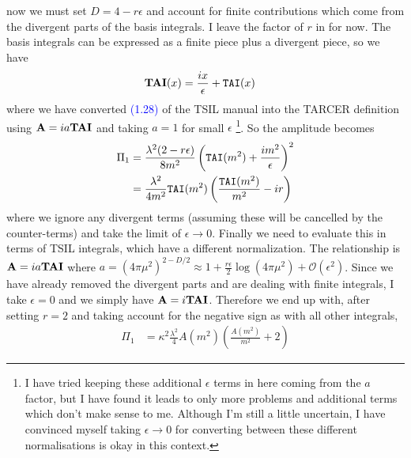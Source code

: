 \documentclass[11pt]{article}
\begin{document}
now we must set $D=4-r\epsilon$ and account for finite contributions which come from the divergent parts of the basis integrals.  I leave the factor of $r$ in for now.  The basis integrals can be expressed as a finite piece plus a divergent piece, so we have
\begin{align}
{\tt{\mathbf{TAI}}}(x) &= \frac{ix}{\epsilon} +  {\tt{TAI}}(x)
\end{align}
where we have converted \textcolor{blue}{(1.28)} of the TSIL manual into the TARCER definition using $\mathbf{A}= ia \tt{\mathbf{TAI}}$ and taking $a=1$ for small $\epsilon$ \footnote{I have tried keeping these additional $\epsilon$ terms in here coming from the $a$ factor, but I have found it leads to only more problems and additional terms which don't make sense to me.  Although I'm still a little uncertain, I have convinced myself taking $\epsilon \rightarrow 0$ for converting between these different normalisations is okay in this context.}.  So the amplitude becomes
\begin{align*}
\Pi_1 &= \frac{\lambda^2(2-r\epsilon)}{8 m^2 }       \left( {\tt{TAI}}(m^2) +\frac{im^2}{\epsilon}\right)^2  \\
&= \frac{\lambda^2}{4 m^2 }  {\tt{TAI}}(m^2) \left( \frac{ {\tt{TAI}}(m^2) } {m^2} - ir\right)
\end{align*}
where we ignore any divergent terms (assuming these will be cancelled by the counter-terms) and take the limit of $\epsilon\rightarrow 0$.
Finally we need to evaluate this in terms of TSIL integrals, which have a different normalization.  The relationship is $\mathbf{A}= ia \tt{\mathbf{TAI}}$ where $a = (4\pi\mu^2)^{2-D/2} \approx 1 +\frac{r\epsilon}{2}\log(4\pi\mu^2)+\mathcal{O}(\epsilon^2)$.  Since we have already removed the divergent parts and are dealing with finite integrals, I take $\epsilon =  0$ and we simply have $\mathbf{A}= i \tt{\mathbf{TAI}}$.  Therefore we end up with, after setting $r=2$ and taking account for the negative sign as with all other integrals,
\begin{align}
\Pi_1 & = \kappa^2  \frac{\lambda^2}{4 } A(m^2) \left( \frac{A(m^2)}{m^2} + 2 \right)
\end{align}
\end{document}
